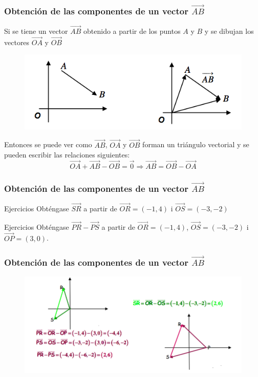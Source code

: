 \documentclass{beamer}
\begin{document}
\begin{frame}
  \frametitle{Obtenci\'on de las componentes de un vector $\vec{AB}$}
  

Si se tiene un vector $\vec{AB}$ obtenido a partir de los puntos $A$ y $B$ y se dibujan los vectores $\vec{OA}$ y $\vec{OB}$
\begin{figure}[h]
    \label{fig:componentes de la suma}
\centering
\includegraphics[width = \textwidth]{components_suma}
\end{figure}
Entonces se puede ver como $\vec{AB}$, $\vec{OA}$ y $\vec{OB}$ forman un tri\'angulo vectorial y se pueden escribir las relaciones siguientes:
\[\vec{OA}+\vec{AB}-\vec{OB} = \vec{0}\Rightarrow \vec{AB} = \vec{OB}-\vec{OA}\]
\end{frame}




\begin{frame}
  \frametitle{Obtenci\'on de las componentes de un vector $\vec{AB}$}
  
  \begin{block}{Ejercicios}
Obt\'engase $\vec{SR}$ a partir de $\vec{OR} = (-1,4)$ i $\vec{OS} = (-3,-2)$
\end{block}

  \begin{block}{Ejercicios}
Obt\'engase $\vec{PR}-\vec{PS}$ a partir de $\vec{OR} = (-1,4)$, $\vec{OS} = (-3,-2)$ i $\vec{OP} = (3,0)$.
\end{block}

\end{frame}





\begin{frame}
  \frametitle{Obtenci\'on de las componentes de un vector $\vec{AB}$}
  

\begin{figure}[h]
    \label{fig:ejemplo sobre componentes}
\centering
\includegraphics[width = \textwidth]{ex_components}
\end{figure}
\end{frame}
\end{document}
